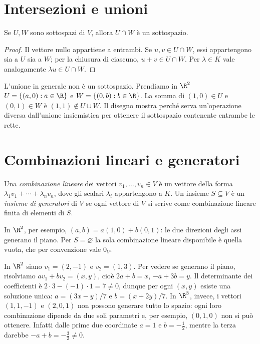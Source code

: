 \section{Intersezioni e unioni}
\begin{proposizione}
Se $U,W$ sono sottospazi di $V$, allora $U\cap W$ è un sottospazio.
\end{proposizione}
\begin{proof}
Il vettore nullo appartiene a entrambi. Se $u,v\in U\cap W$, essi
appartengono sia a $U$ sia a $W$; per la chiusura di ciascuno,
$u+v\in U\cap W$. Per $\lambda\in K$ vale analogamente
$\lambda u\in U\cap W$.
\end{proof}
L'unione in generale non è un sottospazio. Prendiamo in $\R^2$
$U=\{(a,0):a\in\R\}$ e $W=\{(0,b):b\in\R\}$. La somma di
$(1,0)\in U$ e $(0,1)\in W$ è $(1,1)\notin U\cup W$. Il disegno
mostra perché serva un'operazione diversa dall'unione insiemistica per
ottenere il sottospazio contenente entrambe le rette.
\begin{schema}
\end{schema}

\section{Combinazioni lineari e generatori}
\begin{definizione}
Una \emph{combinazione lineare} dei vettori $v_1,\ldots,v_n\in V$ è un
vettore della forma $\lambda_1v_1+\cdots+\lambda_nv_n$, dove gli
scalari $\lambda_i$ appartengono a $K$. Un insieme $S\subseteq V$ è un
\emph{insieme di generatori} di $V$ se ogni vettore di $V$ si scrive
come combinazione lineare finita di elementi di $S$.
\end{definizione}
In $\R^2$, per esempio,
$(a,b)=a(1,0)+b(0,1)$: le due direzioni degli assi generano il piano.
Per $S=\varnothing$ la sola combinazione lineare disponibile è quella
vuota, che per convenzione vale $0_V$.

\begin{esercizio}
In $\R^2$ siano $v_1=(2,-1)$ e $v_2=(1,3)$. Per vedere se generano
il piano, risolviamo
$a v_1+b v_2=(x,y)$, cioè
$2a+b=x$, $-a+3b=y$. Il determinante dei coefficienti è
$2\cdot3-(-1)\cdot1=7\ne0$, dunque per ogni $(x,y)$ esiste una
soluzione unica: $a=(3x-y)/7$ e $b=(x+2y)/7$. In $\R^3$, invece, i
vettori $(1,1,-1)$ e $(2,0,1)$ non possono generare tutto lo spazio:
ogni loro combinazione dipende da due soli parametri e, per esempio,
$(0,1,0)$ non si può ottenere. Infatti dalle prime due coordinate
$a=1$ e $b=-\tfrac12$, mentre la terza darebbe
$-a+b=-\tfrac32\ne0$.
\end{esercizio}
